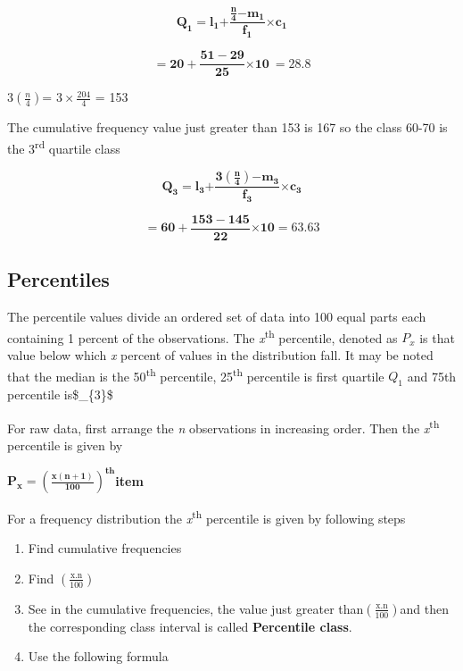 \documentclass[
]{book}
\begin{document}
\[\mathbf{Q}_{\mathbf{1}}\mathbf{=}\mathbf{l}_{\mathbf{1}}\mathbf{+}\frac{\frac{\mathbf{n}}{\mathbf{4}}\mathbf{-}\mathbf{m}_{\mathbf{1}}}{\mathbf{f}_{\mathbf{1}}}\mathbf{\times}\mathbf{c}_{\mathbf{1}}\]

\[\mathbf{= 20 +}\frac{\mathbf{51 - 29}}{\mathbf{25}}\mathbf{\times 10\  = 28.8}\]

\(3\left( \frac{n}{4} \right)\)= \(3 \times \frac{204}{4}\) = 153

The cumulative frequency value just greater than 153 is 167 so the class
60-70 is the 3\textsuperscript{rd} quartile class

\[\mathbf{Q}_{\mathbf{3}}\mathbf{=}\mathbf{l}_{\mathbf{3}}\mathbf{+}\frac{\mathbf{3}\left( \frac{\mathbf{n}}{\mathbf{4}} \right)\mathbf{-}\mathbf{m}_{\mathbf{3}}}{\mathbf{f}_{\mathbf{3}}}\mathbf{\times}\mathbf{c}_{\mathbf{3}}\]

\[\mathbf{= 60 +}\frac{\mathbf{153 - 145}}{\mathbf{22}}\mathbf{\times 10 = 63.63}\]

\subsection{Percentiles}\label{percentiles}

The percentile values divide an ordered set of data into 100 equal parts
each containing 1 percent of the observations. The \emph{x}\textsuperscript{th} percentile,
denoted as \(P_{x}\) is that value below which \emph{x} percent of values in
the distribution fall. It may be noted that the median is the 50\textsuperscript{th}
percentile, 25\textsuperscript{th} percentile is first quartile \(Q_{1}\) and 75th
percentile is\$\_\{3\}\$

For raw data, first arrange the \emph{n} observations in increasing order.
Then the \emph{x}\textsuperscript{th} percentile is given by

\(\mathbf{P}_{\mathbf{x}}\mathbf{=}\left( \frac{\mathbf{x}\left( \mathbf{n + 1} \right)}{\mathbf{100}} \right)^{\mathbf{\text{th}}}\)\textbf{item}

For a frequency distribution the \emph{x}\textsuperscript{th} percentile is given by
following steps

\begin{enumerate}
\def\labelenumi{\arabic{enumi}.}
\item
  Find cumulative frequencies
\item
  Find \(\left( \frac{\text{x.n}}{100} \right)\)
\item
  See in the cumulative frequencies, the value just greater
  than\(\left( \frac{\text{x.n}}{100} \right)\)and then the
  corresponding class interval is called \textbf{Percentile class}.
\item
  Use the following formula
\end{enumerate}
\end{document}
